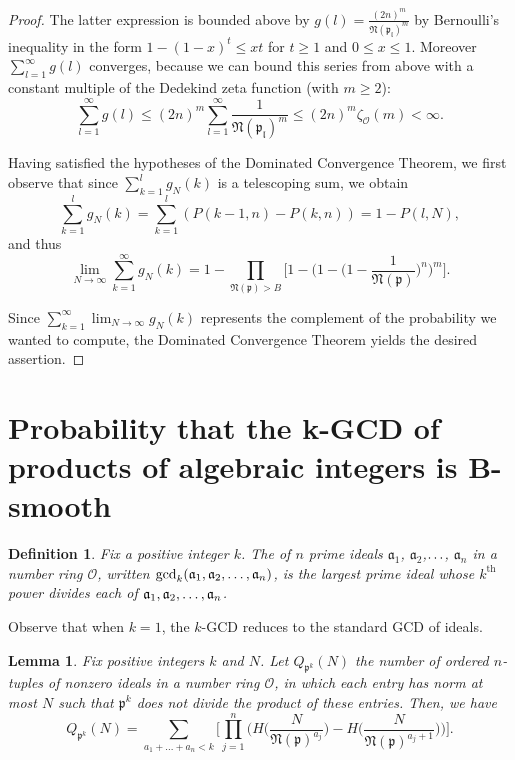 \documentclass[12pt]{amsart}
\newtheorem{lemma}[theorem]{Lemma}
\newtheorem{definition}[theorem]{Definition}
\theoremstyle{definition}
\newcommand{\f}[1]{\mathfrak{#1}}
\begin{document}
\begin{proof}
	The latter expression is bounded above by $g(l) = \frac{(2n)^m}{\f{N(\f{p}_l)}^m}$ by Bernoulli's inequality in the form $1-(1-x)^t\leq xt$ for $t\geq 1$ and $0\leq x \leq 1$. Moreover $\sum_{l=1}^{\infty} g(l)$ converges, because we can bound this series from above with a constant multiple of the Dedekind zeta function (with $m \geq 2$):
	$$\sum_{l=1}^{\infty}g(l)\leq (2n)^m\sum_{l=1}^{\infty}\frac{1}{\f{N(\f{p}_l)}^m}\leq (2n)^m \zeta_{\mathcal{O}}(m) < \infty.$$
	
	Having satisfied the hypotheses of the Dominated Convergence Theorem, we first observe that since $\sum_{k=1}^l g_N(k)$ is a telescoping sum, we obtain
	$$\sum_{k=1}^l g_N(k) = \sum_{k=1}^l (P(k-1, n) - P(k, n)) = 1 - P(l,N),$$ 
	and thus
	$$\lim_{N \to \infty} \sum_{k=1}^{\infty} g_N(k) = 1 - \prod_{\mathfrak{N}(\mathfrak{p}) > B} \Big[1 - \Big(1 - \Big(1 - \frac{1}{\mathfrak{N}(\mathfrak{p})}  \Big)^n\Big)^m\Big].$$
	
	\noindent Since $\displaystyle \sum_{k=1}^{\infty} \lim_{N \to \infty} g_N(k)$ represents the complement of the probability we wanted to compute, the Dominated Convergence Theorem yields the desired assertion.
\end{proof}


\section{Probability that the k-GCD of products of algebraic integers is B-smooth}

\begin{definition} Fix a positive integer $k$. The  of $n$ prime ideals $\f{a}_1$, $\f{a}_2$,$\mathellipsis$, $\f{a}_n$ in a number ring $\mathcal{O}$, written $\gcd_k(\f{a}_1,\f{a}_2, \mathellipsis,\f{a}_n)$, is the largest prime ideal whose $k^{\text{th}}$ power divides each of $\f{a}_1, \f{a}_2,\mathellipsis, \f{a}_n$.
\end{definition}	

\noindent Observe that when $k=1$, the $k$-GCD reduces to the standard GCD of ideals.

\begin{lemma}
	Fix positive integers $k$ and $N$. Let $Q_{\f{p}^k}(N)$ the number of ordered $n$-tuples of nonzero ideals in a number ring $\mathcal{O}$, in which each entry has norm at most $N$ such that $\f{p}^k$ does not divide the product of these entries. Then, we have
	$$Q_{\f{p}^k}(N) = \sum_{a_1+...+a_n < k} \Big[\prod_{j=1}^n \Big(H\bigg( \frac{N}{\f{N}(\f{p})^{a_j}}\bigg) - H\bigg(\frac{N}{\f{N}(\f{p})^{a_j + 1}}\bigg)\Big)\Big].$$
\end{lemma}
\end{document}

